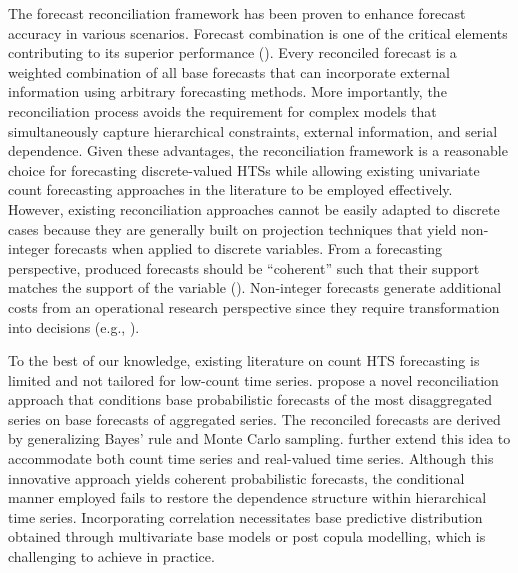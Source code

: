 \documentclass[a4paper,review,12pt,authoryear]{elsarticle}
\begin{document}
The forecast reconciliation framework has been proven to enhance forecast accuracy in various scenarios. 
Forecast combination is one of the critical elements contributing to its superior performance (\citealp{hollymanUnderstandingForecastReconciliation2021}). 
Every reconciled forecast is a weighted combination of all base forecasts that
can incorporate external information using arbitrary forecasting methods.
More importantly, the reconciliation process avoids the requirement for complex models that  simultaneously capture hierarchical constraints, external information, and serial dependence.
Given these advantages, the reconciliation framework is a reasonable choice for forecasting discrete-valued HTSs while allowing existing univariate count forecasting approaches in the literature to be employed effectively.
However, existing reconciliation approaches cannot be easily adapted to discrete cases because they are generally built on projection techniques that yield non-integer forecasts when applied to discrete variables.
From a forecasting perspective, produced forecasts should be ``coherent'' such that their support matches the support of the variable (\citealp{freelandForecastingDiscreteValued2004}). 
Non-integer forecasts generate additional costs from an operational research perspective since they require transformation into decisions (e.g., \citealp{goltsosInventoryForecastingMind2022}).

To the best of our knowledge, existing literature on count HTS forecasting is limited and not tailored for low-count time series.
\cite{coraniProbabilisticReconciliationCount2022} propose a novel reconciliation approach that conditions base probabilistic forecasts of the most disaggregated series on base forecasts of aggregated series. 
The reconciled forecasts are derived by generalizing Bayes’ rule and Monte Carlo sampling.
\cite{zambonEfficientProbabilisticReconciliation2022} further extend this idea to accommodate both count time series and real-valued time series.
Although this innovative approach yields coherent probabilistic forecasts, 
the conditional manner employed fails to restore the dependence structure within hierarchical time series.
Incorporating correlation necessitates base predictive distribution obtained through multivariate base models or post copula modelling, which is challenging to achieve in practice.
\end{document}
